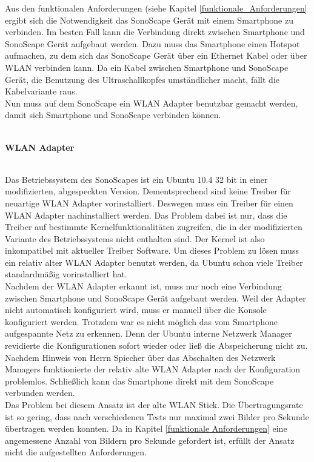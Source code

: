 Aus den funktionalen Anforderungen (siehe Kapitel \ref{funktionale_Anforderungen} ergibt sich die Notwendigkeit das SonoScape Gerät mit einem Smartphone zu verbinden. Im besten Fall kann die Verbindung direkt zwischen Smartphone und SonoScape Gerät aufgebaut werden. Dazu muss das Smartphone einen Hotspot aufmachen, zu dem sich das SonoScape Gerät über ein Ethernet Kabel oder über WLAN verbinden kann. Da ein Kabel zwischen Smartphone und SonoScape Gerät, die Benutzung des Ultraschallkopfes umständlicher macht, fällt die Kabelvariante raus.\\
Nun muss auf dem SonoScape ein WLAN Adapter benutzbar gemacht werden, damit sich Smartphone und SonoScape verbinden können.\\\\
\begin{large}
\textbf{WLAN Adapter}\\\\
\end{large}
Das Betriebssystem des SonoScapes ist ein Ubuntu 10.4 32 bit in einer modifizierten, abgespeckten Version. Dementsprechend sind keine Treiber für neuartige WLAN Adapter vorinstalliert. Deswegen muss ein Treiber für einen WLAN Adapter nachinstalliert werden. Das Problem dabei ist nur, dass die Treiber auf bestimmte Kernelfunktionalitäten zugreifen, die in der modifizierten Variante des Betriebssystems nicht enthalten sind. Der Kernel ist also inkompatibel mit aktueller Treiber Software. Um dieses Problem zu lösen muss ein relativ alter WLAN Adapter benutzt werden, da Ubuntu schon viele Treiber standardmäßig vorinstalliert hat. \\
Nachdem der WLAN Adapter erkannt ist, muss nur noch eine Verbindung zwischen Smartphone und SonoScape Gerät aufgebaut werden. Weil der Adapter nicht automatisch konfiguriert wird, muss er manuell über die Konsole konfiguriert werden. Trotzdem war es nicht möglich das vom Smartphone aufgespannte Netz zu erkennen. Denn der Ubuntu interne Netzwerk Manager revidierte die Konfigurationen sofort wieder oder ließ die Abspeicherung nicht zu. Nachdem Hinweis von Herrn Spiecher über das Abschalten des Netzwerk Managers funktionierte der relativ alte WLAN Adapter nach der Konfiguration problemlos. Schließlich kann das Smartphone direkt mit dem SonoScape verbunden werden.\\
Das Problem bei diesem Ansatz ist der alte WLAN Stick. Die Übertragungsrate ist so gering, dass nach verschiedenen Tests nur maximal zwei Bilder pro Sekunde übertragen werden konnten. Da in Kapitel \ref{funktionale Anforderungen} eine angemessene Anzahl von Bildern pro Sekunde gefordert ist, erfüllt der Ansatz nicht die aufgestellten Anforderungen.\\\\
